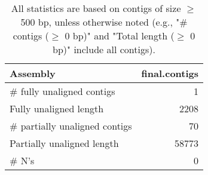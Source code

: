 \documentclass[12pt,a4paper]{article}
\begin{document}
\begin{table}[ht]
\begin{center}
\caption{All statistics are based on contigs of size $\geq$ 500 bp, unless otherwise noted (e.g., "\# contigs ($\geq$ 0 bp)" and "Total length ($\geq$ 0 bp)" include all contigs).}
\begin{tabular}{|l*{1}{|r}|}
\hline
Assembly & final.contigs \\ \hline
\# fully unaligned contigs & 1 \\ \hline
Fully unaligned length & 2208 \\ \hline
\# partially unaligned contigs & 70 \\ \hline
Partially unaligned length & 58773 \\ \hline
\# N's & 0 \\ \hline
\end{tabular}
\end{center}
\end{table}
\end{document}
